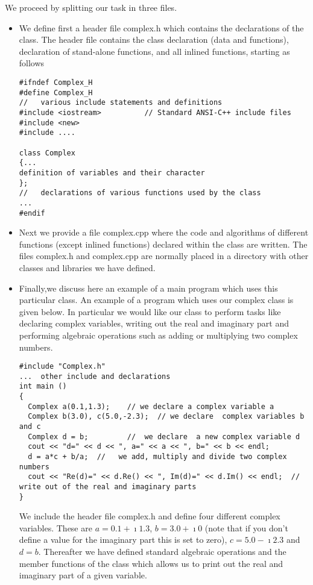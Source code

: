 We proceed by  splitting our task in three files.  
\begin{itemize}
\item We define first a header file complex.h  which contains the declarations of
the class. The header file contains the class declaration (data and
functions), declaration of stand-alone functions, and all inlined
functions, starting as follows
\begin{lstlisting}
#ifndef Complex_H
#define Complex_H
//   various include statements and definitions
#include <iostream>          // Standard ANSI-C++ include files
#include <new>
#include ....

class Complex
{...
definition of variables and their character
};
//   declarations of various functions used by the class
...
#endif
\end{lstlisting}
\item Next we provide a file complex.cpp where the code and algorithms of different functions  (except inlined functions) 
declared within the class are written.
The files complex.h and complex.cpp are normally placed in a directory with other classes and libraries we have 
defined.  
\item Finally,we discuss here an example of a main program which uses this particular class.
An example of a program which uses our complex class is given below. In particular we would like our class to
perform tasks like declaring complex variables, writing out the real and imaginary part and performing 
algebraic operations such as adding or multiplying two complex numbers.
\begin{lstlisting}
#include "Complex.h"
...  other include and declarations
int main ()
{
  Complex a(0.1,1.3);    // we declare a complex variable a
  Complex b(3.0), c(5.0,-2.3);  // we declare  complex variables b and c
  Complex d = b;         //  we declare  a new complex variable d 
  cout << "d=" << d << ", a=" << a << ", b=" << b << endl;
  d = a*c + b/a;  //   we add, multiply and divide two complex numbers 
  cout << "Re(d)=" << d.Re() << ", Im(d)=" << d.Im() << endl;  // write out of the real and imaginary parts
}
\end{lstlisting}
We include the header file complex.h and define four different complex variables. These
are $a=0.1+\imath 1.3$, $b=3.0+\imath 0$ (note that if you don't define a value for the imaginary part  this is set to
zero), $c=5.0-\imath 2.3$ and $d=b$.  Thereafter we have defined standard algebraic operations and the member functions
of the class which allows us to print out the real and imaginary part of a given variable.
\end{itemize}

